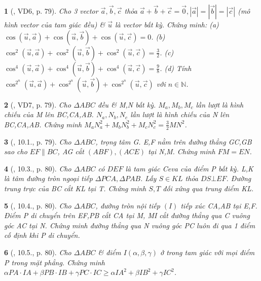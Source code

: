 \documentclass{article}
\newtheorem{baitoan}{}
\begin{document}
\begin{baitoan}[\cite{Hai_Hung_Thu_Tung2022_tap_1}, VD6, p. 79]
	Cho 3 vector $\vec{a},\vec{b},\vec{c}$ thỏa $\vec{a} + \vec{b} + \vec{c} = \vec{0},|\vec{a}| = |\vec{b}| = |\vec{c}|$ (mô hình vector của tam giác đều) \& $\vec{u}$ là vector bất kỳ. Chứng minh: (a) $\cos(\vec{u},\vec{a}) + \cos(\vec{u},\vec{b}) + \cos(\vec{u},\vec{c}) = 0$. (b) $\cos^2(\vec{u},\vec{a}) + \cos^2(\vec{u},\vec{b}) + \cos^2(\vec{u},\vec{c}) = \frac{3}{2}$. (c) $\cos^4(\vec{u},\vec{a}) + \cos^4(\vec{u},\vec{b}) + \cos^4(\vec{u},\vec{c}) = \frac{9}{8}$. (d) Tính $\cos^{2^n}(\vec{u},\vec{a}) + \cos^{2^n}(\vec{u},\vec{b}) + \cos^{2^n}(\vec{u},\vec{c})$ với $n\in\mathbb{N}$.
\end{baitoan}

\begin{baitoan}[\cite{Hai_Hung_Thu_Tung2022_tap_1}, VD7, p. 79]
	Cho $\Delta ABC$ đều \& M,N bất kỳ. $M_a,M_b,M_c$ lần lượt là hình chiếu của M lên BC,CA,AB. $N_a,N_b,N_c$ lần lượt là hình chiếu của N lên BC,CA,AB. Chứng minh $M_aN_a^2 + M_bN_b^2 + M_cN_c^2 = \frac{3}{2}MN^2$. 
\end{baitoan}

\begin{baitoan}[\cite{Hai_Hung_Thu_Tung2022_tap_1}, 10.1., p. 79]
	Cho $\Delta ABC$, trọng tâm G. E,F nằm trên đường thẳng GC,GB sao cho $EF\parallel BC$, AG cắt $(ABF),(ACE)$ tại N,M. Chứng minh $FM = EN$.
\end{baitoan}

\begin{baitoan}[\cite{Hai_Hung_Thu_Tung2022_tap_1}, 10.3., p. 80]
	Cho $\Delta ABC$ có $DEF$ là tam giác Ceva của điểm P bất kỳ. L,K là tâm đường tròn ngoại tiếp $\Delta PCA,\Delta PAB$. Lấy $S\in KL$ thỏa $DS\bot EF$. Đường trung trực của BC cắt KL tại T. Chứng minh $S,T$ đối xứng qua trung điểm KL.
\end{baitoan}

\begin{baitoan}[\cite{Hai_Hung_Thu_Tung2022_tap_1}, 10.4., p. 80]
	Cho $\Delta ABC$, đường tròn nội tiếp $(I)$ tiếp xúc CA,AB tại E,F. Điểm P di chuyển trên EF,PB cắt CA tại M, MI cắt đường thẳng qua C vuông góc AC tại N. Chứng minh đường thẳng qua N vuông góc PC luôn đi qua 1 điểm cố định khi P di chuyển.
\end{baitoan}

\begin{baitoan}[\cite{Hai_Hung_Thu_Tung2022_tap_1}, 10.5., p. 80]
	Cho $\Delta ABC$ \& điểm $I(\alpha,\beta,\gamma)$ ở trong tam giác với mọi điểm P trong mặt phẳng. Chứng minh $\alpha PA\cdot IA + \beta PB\cdot IB + \gamma PC\cdot IC\ge\alpha IA^2 + \beta IB^2 + \gamma IC^2$.
\end{baitoan}
\end{document}
